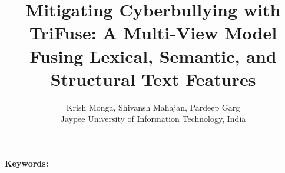 \documentclass[11pt,a4paper]{article}
\title{Mitigating Cyberbullying with TriFuse: A Multi-View Model Fusing Lexical, Semantic, and Structural Text Features}
\author{Krish Monga, Shivansh Mahajan, Pardeep Garg\\Jaypee University of Information Technology, India}
\date{}
\begin{document}
\maketitle
\begin{abstract}

\end{abstract}
\noindent\textbf{Keywords:} 


\end{document}
